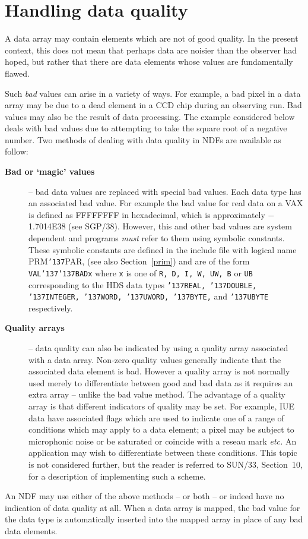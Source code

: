 \documentclass[twoside,11pt]{article}
\renewcommand{\_}{{\tt\char'137}}
\newcommand{\xref}[3]{#1}
\newcommand{\xlabel}[1]{}
\begin{document}
\newpage
\section{Handling data quality\label{badpix}\xlabel{handling_data_quality}}

A data array may contain elements which are not of good quality.
In the present context, this does not mean that perhaps data are noisier than
the observer had hoped,
but rather that there are data elements whose values are fundamentally
flawed.

Such {\sl bad\/} values can arise in a variety of ways.
For example, a bad pixel in a  data array may be due to a dead element
in a CCD chip during an observing run.
Bad values may also be the result of data processing.
The example considered below deals with bad values due to
attempting to take the square root of a negative number.
Two methods of dealing with data quality in NDFs are
available as follow:
\begin{description}
\item[{\bf Bad or `magic' values}] -- bad data values are replaced with special
bad values. Each data type has an associated bad value. For example
the bad value for real data on a VAX is defined as
FFFFFFFF in hexadecimal,  which is approximately  $-$1.7014E38
(see \xref{SGP/38}{sgp38}{}).
However, this and other bad values are system
dependent and programs {\sl must\/} refer to them using symbolic
constants. These symbolic constants are defined in the include file with
logical name PRM\_PAR, (see also Section~\ref{prim}) and are of the form {\tt VAL\_\_BADx} where {\tt x}
is one of {\tt R, D, I, W, UW, B} or {\tt UB}  corresponding to the
HDS data types {\tt \_REAL,
\_DOUBLE, \_INTEGER, \_WORD, \_UWORD, \_BYTE,} and {\tt\_UBYTE} respectively.
\item[{\bf Quality arrays}] -- data quality can also be indicated by
using a quality array associated with a data array.
Non-zero quality values generally indicate that the
associated data element is bad.
However a quality array is not normally used merely to
differentiate between good
and bad data as it requires an extra array -- unlike the bad value method.
The advantage of a quality array is that different indicators of
quality may be set. For example, IUE data have associated flags which
are used to indicate one of a range of conditions which may apply to a
data element; a pixel may be subject to microphonic noise
or be saturated or coincide with a reseau mark {\it etc.}
An application may wish to differentiate between these conditions.
This topic is not considered further, but the reader is referred to
\xref{SUN/33}{sun33}{},
Section~10, for a description of implementing such a scheme.
\end{description}
An NDF may use either of the above methods -- or both  -- or indeed
have no indication of data quality at all.
When a data array is mapped,
the bad value for the data type
is automatically inserted into the mapped array in place of any
bad data elements.
\end{document}
